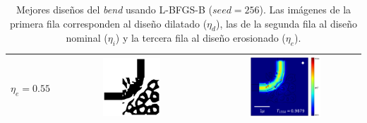 \begin{table}[ht]
\begin{tabular}{|c|c|c|}
    \hline
      $\eta_e = 0.55$ &
      \includegraphics[width=0.40\textwidth]{image/results/bend/L-BFGS-B/best/eps_eta_e_256.png} &
      \includegraphics[width=0.50\textwidth]{image/results/bend/L-BFGS-B/best/field_eta_e_256.png} \\
    \hline
    \end{tabular}
    \hspace*{-3cm}
    \caption{Mejores diseños del \emph{bend} usando L-BFGS-B  ($seed = 256$).
    Las imágenes de la primera fila corresponden al diseño dilatado ($\eta_d$), 
    las de la segunda fila al diseño nominal ($\eta_i$) y la tercera fila al diseño erosionado ($\eta_e$).}
    \label{tab:best-bend-L-BFGS-B}
\end{table}


